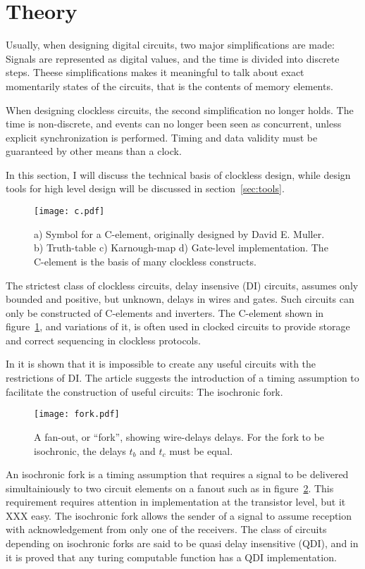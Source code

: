 \section{Theory}

Usually, when designing digital circuits, two major simplifications
are made: Signals are represented as digital values, and the time is
divided into discrete steps. Theese simplifications makes it
meaningful to talk about exact momentarily states of the
circuits, that is the contents of memory elements.

When designing clockless circuits, the second simplification no longer
holds. The time is non-discrete, and events can no longer been seen as
concurrent, unless explicit synchronization is performed. Timing and
data validity must be guaranteed by other means than a clock.

In this section, I will discuss the technical basis of clockless
design, while design tools for high level design will be discussed in
section~\ref{sec:tools}.

\begin{figure}[htbp]
  \centering
  \texttt{[image: c.pdf]}
  \caption{a) Symbol for a C-element, originally designed by David
    E. Muller. b) Truth-table c) Karnough-map d) Gate-level
    implementation. The C-element is the basis of many clockless
    constructs.}
  \label{fig:c}
\end{figure}

The strictest class of clockless circuits, delay insensive (DI)
circuits, assumes only bounded and positive, but unknown, delays in
wires and gates. Such circuits can only be constructed of C-elements
and inverters. The C-element shown in figure~\ref{fig:c}, and
variations of it, is often used in clocked circuits to provide storage
and correct sequencing in clockless protocols.

In \cite{dilimit} it is shown that it is impossible to create any
useful circuits with the restrictions of DI. The article suggests the
introduction of a timing assumption to facilitate the construction of
useful circuits: The isochronic fork.

\begin{figure}[htbp]
  \centering
  \texttt{[image: fork.pdf]}
  \caption{A fan-out, or ``fork'', showing wire-delays delays. For the
    fork to be isochronic, the delays $t_b$ and $t_c$ must be equal.}
  \label{fig:fork}
\end{figure}

An isochronic fork is a timing assumption that requires a signal to be
delivered simultainiously to two circuit elements on a fanout such as
in figure~\ref{fig:fork}. This requirement requires attention in
implementation at the transistor level, but it XXX easy. The
isochronic fork allows the sender of a signal to assume reception with
acknowledgement from only one of the receivers. The class of circuits
depending on isochronic forks are said to be quasi delay insensitive
(QDI), and in \cite{turing} it is proved that any turing computable
function has a QDI implementation.

